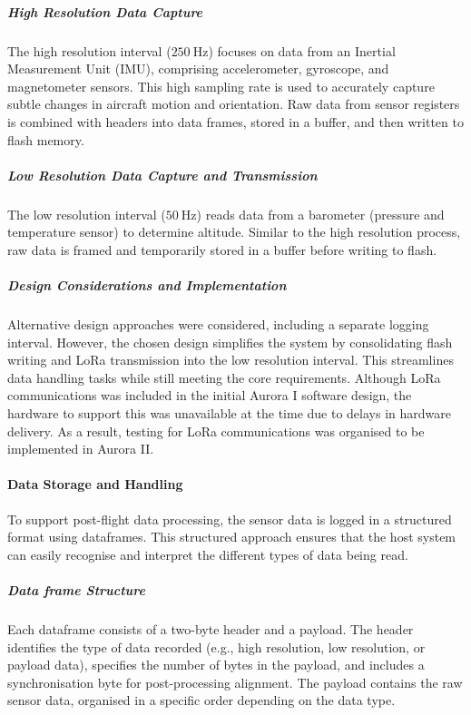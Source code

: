 \subparagraph{High Resolution Data Capture}

The high resolution interval ($\SI{250}{\hertz}$) focuses on data from an Inertial Measurement Unit (IMU), comprising accelerometer, gyroscope, and magnetometer sensors. This high sampling rate is used to accurately capture subtle changes in aircraft motion and orientation. Raw data from sensor registers is combined with headers into data frames, stored in a buffer, and then written to flash memory. 

\subparagraph{Low Resolution Data Capture and Transmission}

The low resolution interval ($\SI{50}{\hertz}$) reads data from a barometer (pressure and temperature sensor) to determine altitude. Similar to the high resolution process, raw data is framed and temporarily stored in a buffer before writing to flash. 

\subparagraph{Design Considerations and Implementation}

Alternative design approaches were considered, including a separate logging interval. However, the chosen design simplifies the system by consolidating flash writing and LoRa transmission into the low resolution interval. This streamlines data handling tasks while still meeting the core requirements. Although LoRa communications was included in the initial Aurora I software design, the hardware to support this was unavailable at the time due to delays in hardware delivery. As a result, testing for LoRa communications was organised to be implemented in Aurora II.  

\paragraph{Data Storage and Handling}

To support post-flight data processing, the sensor data is logged in a structured format using dataframes. This structured approach ensures that the host system can easily recognise and interpret the different types of data being read. 

\subparagraph{Data frame Structure}\label{sec:dataframe}

Each dataframe consists of a two-byte header and a payload. The header identifies the type of data recorded (e.g., high resolution, low resolution, or payload data), specifies the number of bytes in the payload, and includes a synchronisation byte for post-processing alignment. The payload contains the raw sensor data, organised in a specific order depending on the data type.  

